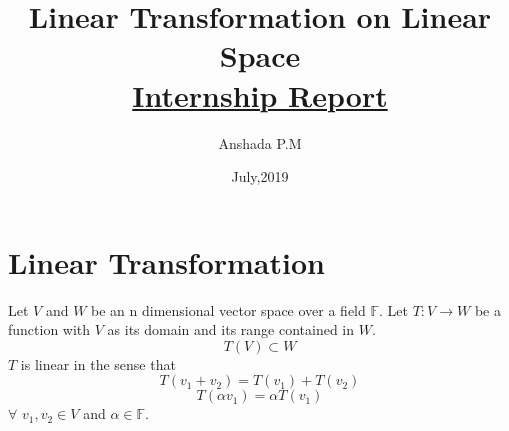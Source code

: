 \documentclass[12pt]{article}
\theoremstyle{definition}
\begin{document}
	\title{\textbf{Linear Transformation on Linear Space} \\
		\large\underline{Internship Report} 
	}
	\author{Anshada P.M}
	\date{July,2019}
	\maketitle
	\section{Linear Transformation}
	Let $ V $ and $W $ be an n dimensional vector space over a field $ \mathbb{F} $. Let $ T :V\rightarrow W $ be a function with $ V $ as its domain and its range contained in $ W $. $$ T(V)\subset W $$$ T $ is linear in the sense that $$ T(v_1 + v_2) = T(v_1)+T(v_2) $$ $$ T(\alpha v_1)=\alpha T(v_1)$$ 
	$\forall$ $ v_1,v_2 \in V$ and $\alpha\in\mathbb{F}$.\\
	
\end{document}
